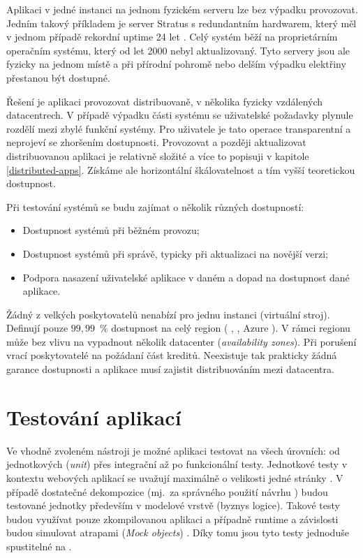         Aplikaci v jedné instanci na jednom fyzickém serveru lze bez výpadku provozovat. Jedním takový příkladem je server Stratus s redundantním hardwarem, který měl v jednom případě rekordní uptime 24 let \cite{thibodeau-longest-uptime}. Celý systém běží na proprietárním operačním systému, který od let 2000 nebyl aktualizovaný. Tyto servery jsou ale fyzicky na jednom místě a při přírodní pohromě nebo delším výpadku elektřiny přestanou být dostupné.

        Řešení je aplikaci provozovat distribuovaně, v několika fyzicky vzdálených datacentrech. V případě výpadku části systému se uživatelské požadavky plynule rozdělí mezi zbylé funkční systémy. Pro uživatele je tato operace transparentní a neprojeví se zhoršením dostupnosti. Provozovat a později aktualizovat distribuovanou aplikaci je relativně složité a více to popisuji v kapitole \ref{distributed-apps}. Získáme ale horizontální škálovatelnost a tím vyšší teoretickou dostupnost.

        Při testování \CICD systémů se budu zajímat o několik různých dostupností:
        \begin{itemize}
            \item Dostupnost \CICD systémů při běžném provozu;
            \item Dostupnost \CICD systémů při správě, typicky při aktualizaci na novější verzi;
            \item Podpora nasazení uživatelské aplikace v daném \CICD a dopad na dostupnost dané aplikace.
        \end{itemize}

        Žádný z velkých poskytovatelů nenabízí  pro jednu instanci (virtuální stroj). Definují pouze $99,99$~\% dostupnost na celý region ( \cite{aws-sla},  \cite{gcp-sla}, Azure \cite{azure-sla}). V rámci regionu může bez vlivu na  vypadnout několik datacenter (\textit{availability zones}). Při porušení  vrací poskytovatelé na požádaní část kreditů. Neexistuje tak prakticky žádná garance dostupnosti a aplikace musí  zajistit distribuováním mezi datacentra.

    \section{Testování aplikací}
        Ve vhodně zvoleném \CI nástroji je možné aplikaci testovat na všech úrovních: od jednotkových (\textit{unit}) přes integrační až po funkcionální testy. Jednotkové testy v kontextu webových aplikací se uvažují maximálně o velikosti jedné stránky \cite{testing-web-apps}. V případě dostatečné dekompozice (mj.~za správného použití návrhu ) budou testované jednotky především v modelové vrstvě (byznys logice). Takové testy budou využívat pouze zkompilovanou aplikaci a případně runtime a závislosti budou simulovat atrapami (\textit{Mock objects}) \cite{mocks}. Díky tomu jsou tyto testy jednoduše spustitelné na \CI.

